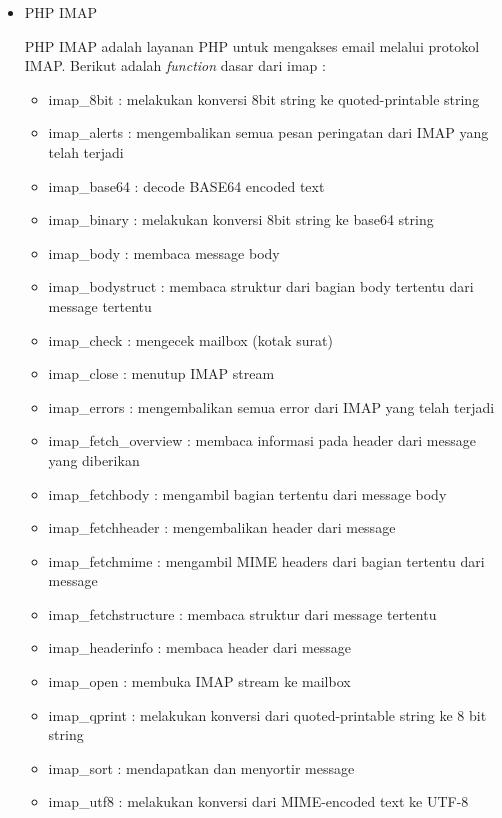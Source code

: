 \documentclass[a4paper,twoside]{article}
\begin{document}
\begin{enumerate}
\begin{itemize}
\begin{itemize}
\begin{itemize}
			\end{itemize}
			
		\end{itemize}
		
		\item PHP IMAP
		
		PHP IMAP adalah layanan PHP untuk mengakses email melalui protokol IMAP.  Berikut adalah \textit{function} dasar dari imap :
		\begin{itemize}
			\item imap\_8bit : melakukan konversi 8bit string ke quoted-printable string
			\item imap\_alerts : mengembalikan semua pesan peringatan dari IMAP yang telah terjadi
			\item imap\_base64 : decode BASE64 encoded text
			\item imap\_binary : melakukan konversi 8bit string ke base64 string
			\item imap\_body : membaca message body
			\item imap\_bodystruct : membaca struktur dari bagian body tertentu dari message tertentu
			\item imap\_check : mengecek mailbox (kotak surat)
			\item imap\_close : menutup IMAP stream
			\item imap\_errors : mengembalikan semua error dari IMAP yang telah terjadi
			\item imap\_fetch\_overview : membaca informasi pada header dari message yang diberikan
			\item imap\_fetchbody : mengambil bagian tertentu dari message body
			\item imap\_fetchheader : mengembalikan header dari message
			\item imap\_fetchmime : mengambil MIME headers dari bagian tertentu dari message
			\item imap\_fetchstructure : membaca struktur dari message tertentu
			\item imap\_headerinfo : membaca header dari message
			\item imap\_open : membuka IMAP stream ke mailbox
			\item imap\_qprint : melakukan konversi dari quoted-printable string ke 8 bit string
			\item imap\_sort : mendapatkan dan menyortir message
			\item imap\_utf8 : melakukan konversi dari MIME-encoded text ke UTF-8
		\end{itemize}
		

\end{itemize}
\end{enumerate}
\end{document}
